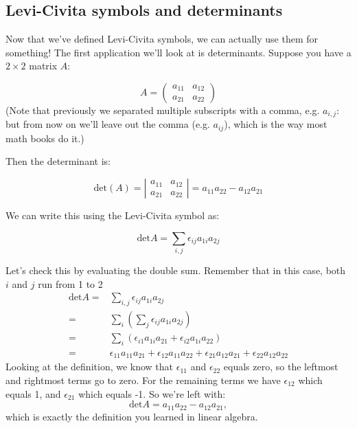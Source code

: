 \subsection{Levi-Civita symbols and determinants}
\label{subsec:SigmaApp:LeviCivitaAndApp:LeviCivitaDet} 

Now that we've defined Levi-Civita symbols, we can actually use them for something!  The first application we'll look at is determinants.  Suppose you have a $2 \times 2 $ matrix $A$:

\[ A = \left( \begin{array}{cc}
a_{11} & a_{12} \\
a_{21} & a_{22} \end{array} \right) \]
\noindent
(Note that previously we separated multiple subscripts with a comma, e.g. $a_{i,j}$: but from now on we'll leave out the comma (e.g. $a_{ij}$), which is the way most math books do it.)

Then the determinant is:

\[ \text{det} (A) = 
 \left| \begin{array}{cc} a_{11} & a_{12} \\
a_{21} & a_{22} \end{array} \right|
= a_{11}a_{22} - a_{12}a_{21} \]

We can write this using the Levi-Civita symbol as:

\[ \text{det} A = \sum_{i,j} \epsilon_{ij} a_{1i} a_{2j} \]

Let's check this by evaluating the double sum. Remember that in this case, both $i$ and $j$ run from 1 to 2
\begin{align*}
\text{det} A =& \sum_{i,j} \epsilon_{ij} a_{1i} a_{2j} \\
=& \sum_{i} \left( \sum_{j} \epsilon_{ij} a_{1i} a_{2j}\right) \\
=& \sum_{i} \left( \epsilon_{i1} a_{1i} a_{21} + \epsilon_{i2} a_{1i} a_{22} \right) \\
=& \epsilon_{11} a_{11} a_{21} + \epsilon_{12} a_{11} a_{22} + \epsilon_{21} a_{12} a_{21} + \epsilon_{22} a_{12} a_{22}
\end{align*}
Looking at the definition, we know that $\epsilon_{11}$ and $\epsilon_{22}$ equals zero, so the leftmost and rightmost terms go to zero.   For the remaining terms we have $\epsilon_{12}$ which equals 1, and $\epsilon_{21}$ which equals -1.  So we're left with:
\[ \text{det} A = a_{11}a_{22} - a_{12}a_{21}, \]
which is exactly the definition you learned in linear algebra.   

